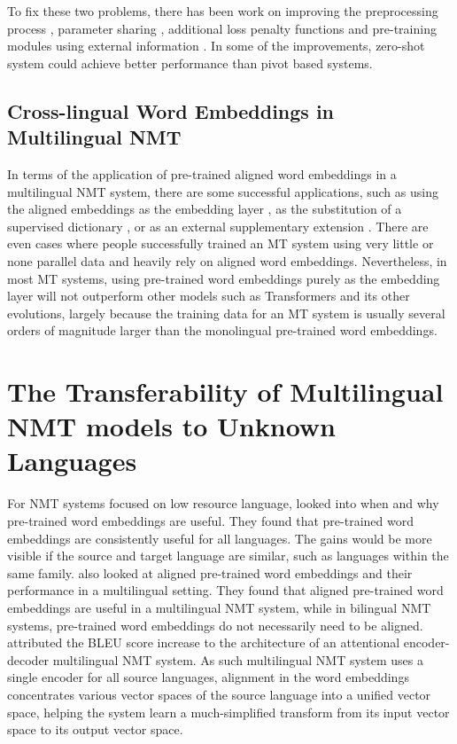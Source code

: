 \documentclass[thesis,fonts=libertine]{cluu}
\begin{document}
To fix these two problems, there has been work on improving the preprocessing process \parencite{Lakew:2018aa}, parameter sharing \parencite{Firat:2016aa, Blackwood:2018aa}, additional loss penalty functions \parencite{Arivazhagan:2019aa} and pre-training modules using external information \parencite{Baziotis:2020aa}. In some of the improvements, zero-shot system could achieve better performance than pivot based systems.

\section{Cross-lingual Word Embeddings in Multilingual NMT}

In terms of the application of pre-trained aligned word embeddings in a multilingual NMT system, there are some successful applications, such as using the aligned embeddings as the embedding layer \parencite{neishi-etal-2017-bag, Artetxe:2017aa}, as the substitution of a supervised dictionary \parencite{Conneau:2017aa}, or as an external supplementary extension \parencite{inproceedings}. There are even cases where people successfully trained an MT system using very little or none parallel data \parencite{Conneau:2017aa} and heavily rely on aligned word embeddings. Nevertheless, in most MT systems, using pre-trained word embeddings purely as the embedding layer will not outperform other models such as Transformers \parencite{Vaswani:2017aa} and its other evolutions, largely because the training data for an MT system is usually several orders of magnitude larger than the monolingual pre-trained word embeddings.

\chapter{The Transferability of Multilingual NMT models to Unknown Languages}
\label{sec:research_question}

For NMT systems focused on low resource language, \textcite{Qi:2018aa} looked into when and why pre-trained word embeddings are useful. They found that pre-trained word embeddings are consistently useful for all languages. The gains would be more visible if the source and target language are similar, such as languages within the same family. \textcite{Qi:2018aa} also looked at aligned pre-trained word embeddings and their performance in a multilingual setting. They found that aligned pre-trained word embeddings are useful in a multilingual NMT system, while in bilingual NMT systems, pre-trained word embeddings do not necessarily need to be aligned. \textcite{Qi:2018aa} attributed the BLEU score increase to the architecture of an attentional encoder-decoder multilingual NMT system. As such multilingual NMT system uses a single encoder for all source languages, alignment in the word embeddings concentrates various vector spaces of the source language into a unified vector space, helping the system learn a much-simplified transform from its input vector space to its output vector space.
\end{document}
